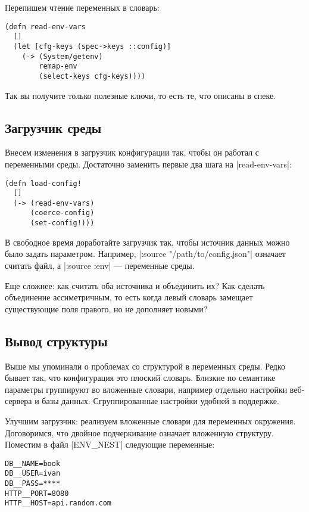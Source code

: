Перепишем чтение переменных в словарь:

\begin{verbatim}
(defn read-env-vars
  []
  (let [cfg-keys (spec->keys ::config)]
    (-> (System/getenv)
        remap-env
        (select-keys cfg-keys))))
\end{verbatim}

Так вы получите только полезные ключи, то есть те, что описаны в спеке.

\subsection{Загрузчик среды}

Внесем изменения в загрузчик конфигурации так, чтобы он работал с переменными
среды. Достаточно заменить первые два шага на \spverb|read-env-vars|:

\begin{verbatim}
(defn load-config!
  []
  (-> (read-env-vars)
      (coerce-config)
      (set-config!)))
\end{verbatim}

В свободное время доработайте загрузчик так, чтобы источник данных можно было
задать параметром. Например, \spverb|:source "/path/to/config.json"| означает считать
файл, а \spverb|:source :env| — переменные среды.

Еще сложнее: как считать оба источника и объединить их? Как сделать объединение
ассиметричным, то есть когда левый словарь замещает существующие поля правого,
но не дополняет новыми?

\subsection{Вывод структуры}

Выше мы упоминали о проблемах со структурой в переменных среды. Редко бывает
так, что конфигурация это плоский словарь. Близкие по семантике параметры
группируют во вложенные словари, например отдельно настройки веб-сервера и базы
данных. Сгруппированные настройки удобней в поддержке.

Улучшим загрузчик: реализуем вложенные словари для переменных
окружения. Договоримся, что двойное подчеркивание означает вложенную
структуру. Поместим в файл \spverb|ENV_NEST| следующие переменные:

\begin{verbatim}
DB__NAME=book
DB__USER=ivan
DB__PASS=****
HTTP__PORT=8080
HTTP__HOST=api.random.com
\end{verbatim}

